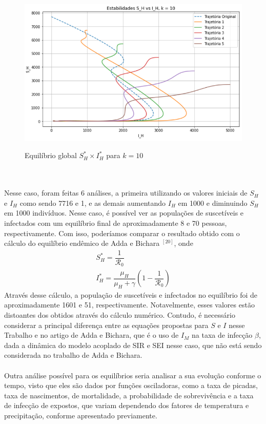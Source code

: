 \documentclass[12pt]{article}
\begin{document}
\begin{figure}[!ht]
        \centering
        \hbox{\hspace{2.2em} \includegraphics[scale=0.7] {Equilibrio_SH_IH_k_10.png}}
        \caption{Equilíbrio global $S_H^* \times I_H^*$ para $k=10$}
\end{figure}
\\\\
Nesse caso, foram feitas 6 análises, a primeira utilizando os
valores iniciais de $S_H$ e $I_H$ como sendo 7716 e 1, e as demais aumentando $I_H$ 
em 1000 e diminuindo $S_H$ em 1000 indivíduos. Nesse caso, é possível
ver as populações de suscetíveis e infectados com um equilíbrio final de
aproximadamente 8 e 70 pessoas, respectivamente. Com isso,
poderíamos comparar o resultado obtido com o cálculo do equilíbrio endêmico de Adda e Bichara
$^{[20]}$, onde
\begin{gather*}
        S_H^* = \dfrac{1}{\mathcal{R}_0} \\
        I_H^* = \dfrac{\mu_H}{\mu_H+\gamma}(1-\dfrac{1}{\mathcal{R}_0})
\end{gather*}       
Através desse cálculo, a população de suscetíveis e infectados no equilíbrio 
foi de aproximadamente 1601 e 51, respectivamente. Notavelmente, esses valores estão distoantes dos 
obtidos através do cálculo numérico. Contudo, é necessário considerar a principal diferença entre as equações
propostas para $S$ e $I$ nesse Trabalho e no artigo de Adda e Bichara, que é o uso de
$I_M$ na taxa de infecção $\beta$, dada a dinâmica do modelo 
acoplado de SIR e SEI nesse caso, que não está sendo considerada no trabalho
de Adda e Bichara.
\\\\ 
Outra análise possível para 
os equilíbrios seria analisar a sua evolução conforme o tempo, visto que eles são dados 
por funções osciladoras, como a taxa de picadas, taxa de nascimentos, de mortalidade, 
a probabilidade de sobrevivência e a taxa de infecção de expostos, que variam dependendo
dos fatores de temperatura e precipitação, conforme apresentado previamente.
\end{document}
